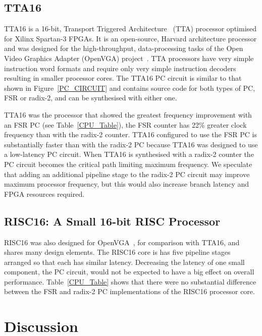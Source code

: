 \documentclass[5p, twocolumn]{elsarticle}
\begin{document}


\subsection{TTA16}

TTA16 is a 16-bit, Transport Triggered Architecture~\cite{corporaal:tta} (TTA)
processor optimised for Xilinx Spartan-3 FPGAs. It is an open-source, Harvard
architecture processor and was designed for the high-throughput, data-processing
tasks of the Open Video Graphics Adapter (OpenVGA) project~\cite{OpenVGA}. TTA
processors have very simple instruction word formats and require only very simple
instruction decoders resulting in smaller processor cores. The TTA16 PC circuit
is similar to that shown in Figure~\ref{PC_CIRCUIT} and contains source code for
both types of PC, FSR or radix-2, and can be synthesised with either one.

TTA16 was the processor that showed the greatest frequency improvement with an
FSR PC (see Table~\ref{CPU_Table}), the FSR counter has 22\% greater clock
frequency than with the radix-2 counter. TTA16 configured to use the FSR PC is
substantially faster than with the radix-2 PC because TTA16 was designed to use a
low-latency PC circuit. When TTA16 is synthesised with a radix-2 counter the PC
circuit becomes the critical path limiting maximum frequency. We speculate that
adding an additional pipeline stage to the radix-2 PC circuit may improve maximum
processor frequency, but this would also increase branch latency and FPGA
resources required.


\subsection{RISC16: A Small 16-bit RISC Processor}

RISC16 was also designed for OpenVGA~\cite{OpenVGA}, for comparison with TTA16,
and shares many design elements. The RISC16 core is has five pipeline stages
arranged so that each has similar latency. Decreasing the latency of one
small component, the PC circuit, would not be expected to have a big effect on
overall performance. Table~\ref{CPU_Table} shows that there were no substantial
difference between the FSR and radix-2 PC implementations of the RISC16 processor
core.



\section{Discussion}
\end{document}

